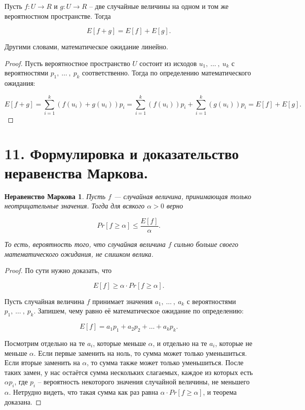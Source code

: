 \documentclass[a4paper, 12pt]{article}
\newtheorem*{markov}{Неравенство Маркова}
\begin{document}
Пусть $f : U \to R$ и $g : U \to R$ – две случайные величины на одном и
том же вероятностном пространстве. Тогда

\[
    E[f + g] = E[f] + E[g].
\]

Другими словами, математическое ожидание линейно.

\begin{proof}
    Пусть вероятностное пространство $U$ состоит из исходов $u_1,\ \ldots\ ,\ u_k$ с вероятностями $p_1,\ \ldots\ ,\ p_k$ соответственно. Тогда по определению математического ожидания:
    
    \[
        E[f + g] = \sum\limits_{i = 1}^k (f(u_i) + g(u_i))p_i = \sum\limits_{i = 1}^k (f(u_i))p_i + \sum\limits_{i = 1}^k (g(u_i))p_i = E[f] + E[g].
    \]

\end{proof}

\section*{11. Формулировка и доказательство неравенства Маркова.}

\begin{markov}
    Пусть $f$ — случайная величина, принимающая только неотрицательные значения. Тогда для всякого $\alpha > 0$ верно
    
    \[
        Pr[f \geq \alpha] \leq \frac{E[f]}{\alpha}.
    \]

    То есть, вероятность того, что случайная величина $f$ сильно больше своего математического ожидания, не слишком велика.

\end{markov}

\begin{proof}
    По сути нужно доказать, что 
    
    \[
        E[f] \geq \alpha \cdot Pr[f \geq \alpha].
    \]
    
    Пусть случайная величина $f$ принимает значения $a_1,\ \ldots\ ,\ a_k$ с вероятностями \\ $p_1,\ \ldots\ ,\ p_k$. Запишем, чему равно её математическое ожидание по определению:
    
    \[
        E[f] = a_1p_1 + a_2p_2 + \ldots + a_kp_k.
    \]
    
    Посмотрим отдельно на те $a_i$, которые меньше $\alpha$, и отдельно на те $a_i$, которые не меньше $\alpha$. Если первые заменить на ноль, то сумма может только уменьшиться. Если вторые заменить на $\alpha$, то сумма также может только уменьшиться. После таких замен, у нас остаётся сумма нескольких слагаемых, каждое из которых есть $\alpha p_i$, где $p_i$ – вероятность некоторого значения случайной величины, не меньшего $\alpha$. Нетрудно видеть, что такая сумма как раз равна $\alpha \cdot Pr[f \geq \alpha]$, и теорема доказана.
    
\end{proof}
\end{document}
